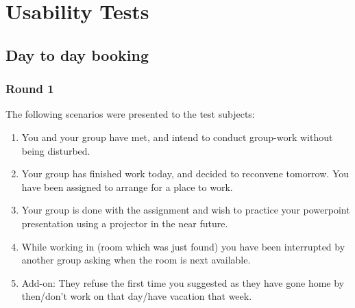 \pagebreak
\section{Usability Tests}
\label{app:tests}
\subsection{Day to day booking}
\subsubsection{Round 1}
The following scenarios were presented to the test subjects:
\begin{enumerate}
\item You and your group have met, and intend to conduct group-work without being disturbed.
\item Your group has finished work today, and decided to reconvene tomorrow. You have been assigned to arrange for a place to work.
\item Your group is done with the assignment and wish to practice your powerpoint presentation using a projector in the near future.
\item While working in (room which was just found) you have been interrupted by another group asking when the room is next available.
\item Add-on: They refuse the first time you suggested as they have gone home by then/don't work on that day/have vacation that week.
\end{enumerate}

